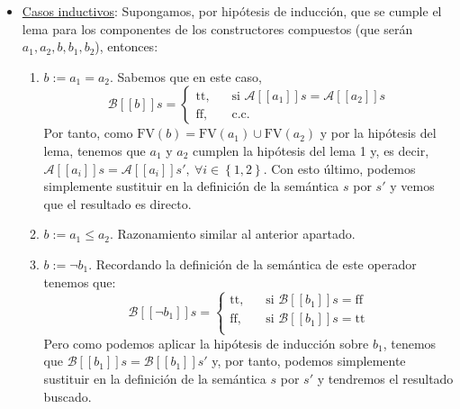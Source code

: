 \begin{sol}
\begin{demo}
\begin{itemize}
        \item \underline{Casos inductivos}: Supongamos, por hipótesis de
            inducción, que se cumple el lema para los componentes de los
            constructores compuestos (que serán $a_1, a_2, b, b_1, b_2$),
            entonces:
            \begin{enumerate}
                \item $\boxed{b := a_1 = a_2}$. Sabemos que en este caso,
                    \[
                        \mathcal{B}[[b]]s = \begin{cases}
                            \text{tt},\quad &\text{si } \mathcal{A}[[a_1]]s =
                            \mathcal{A}[[a_2]]s\\
                            \text{ff},\quad &\text{c.c.}
                        \end{cases}
                    \]
                    Por tanto, como $\mathrm{FV}\left( b \right) =
                    \mathrm{FV}\left( a_1 \right) \cup \mathrm{FV}\left( a_2
                    \right)$ y por la hipótesis del lema, tenemos que $a_1$ y $a_2$
                    cumplen la hipótesis del lema 1 y, es decir,
                    $\mathcal{A}[[a_i]]s = \mathcal{A}[[a_i]]s',\ \forall i \in \left\{
                    1, 2\right\}$. Con esto último, podemos simplemente
                    sustituir en la definición de la semántica $s$ por
                    $s'$ y vemos que el resultado es directo.

                \item $\boxed{b := a_1 \le a_2}$. Razonamiento similar al
                    anterior apartado.

                \item $\boxed{b := \neg b_1}$. Recordando la definición de la
                    semántica de este operador tenemos que:
                    \[
                        \mathcal{B}[[\neg b_1]]s = \begin{cases}
                            \text{tt},\quad &\text{si } \mathcal{B}[[b_1]]s =
                            \text{ff}\\
                            \text{ff},\quad &\text{si } \mathcal{B}[[b_1]]s =
                            \text{tt}\\
                        \end{cases}
                    \]
                    Pero como podemos aplicar la hipótesis de inducción sobre
                    $b_1$, tenemos que $\mathcal{B}[[b_1]]s =
                    \mathcal{B}[[b_1]]s'$ y, por tanto, podemos simplemente
                    sustituir en la definición de la semántica $s$ por $s'$ y
                    tendremos el resultado buscado.


\end{enumerate}
\end{itemize}
\end{demo}
\end{sol}

